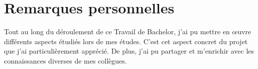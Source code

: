 \section{Remarques personnelles}
Tout au long du déroulement de ce Travail de Bachelor, j'ai pu mettre en \oe uvre différents aspects étudiés lors de mes études. C'est cet 
aspect concret du projet que j'ai particulièrement apprécié. De plus, j'ai pu partager et m'enrichir avec les connaissances diverses de mes 
collègues. 


\vfil
\hspace{8cm}\makeatletter\@author\makeatother\par
\hspace{8cm}\begin{minipage}{5cm}
    \printsignature
\end{minipage}